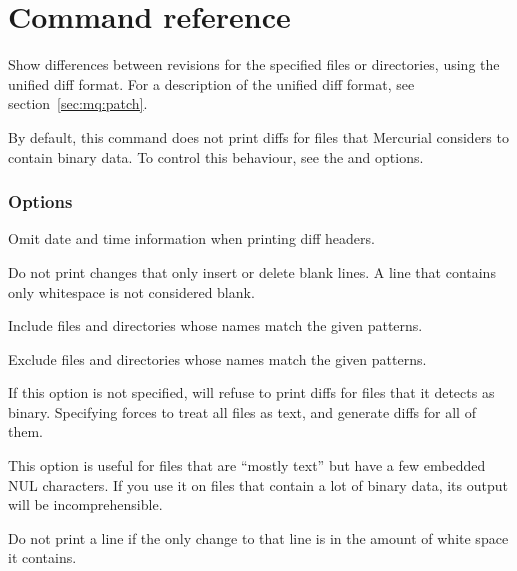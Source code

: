 \chapter{Command reference}
\label{cmdref}



Show differences between revisions for the specified files or
directories, using the unified diff format.  For a description of the
unified diff format, see section~\ref{sec:mq:patch}.

By default, this command does not print diffs for files that Mercurial
considers to contain binary data.  To control this behaviour, see the
 and  options.

\subsection{Options}


Omit date and time information when printing diff headers.


Do not print changes that only insert or delete blank lines.  A line
that contains only whitespace is not considered blank.


Include files and directories whose names match the given patterns.


Exclude files and directories whose names match the given patterns.


If this option is not specified,  will refuse to print
diffs for files that it detects as binary. Specifying 
forces  to treat all files as text, and generate diffs for
all of them.

This option is useful for files that are ``mostly text'' but have a
few embedded NUL characters.  If you use it on files that contain a
lot of binary data, its output will be incomprehensible.


Do not print a line if the only change to that line is in the amount
of white space it contains.

